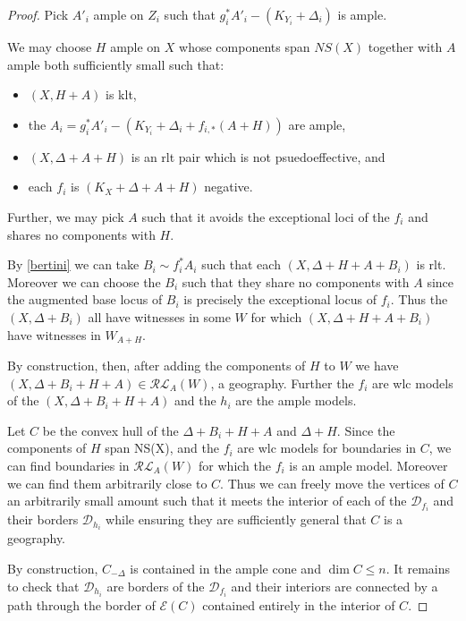 \begin{proof}

	Pick $A'_{i}$ ample on $Z_{i}$ such that $g_{i}^{*}A'_{i}-(K_{Y_{i}}+\Delta_{i})$ is ample. 
	
	We may choose $H$ ample on $X$ whose components span $NS(X)$ together with $A$ ample both sufficiently small such that:
	\begin{itemize}
		\item $(X,H+A)$ is klt,
		\item the $A_{i} = g_{i}^{*}A'_{i}-(K_{Y_{i}}+\Delta_{i}+f_{i,*}(A+H))$ are ample,
		\item $(X,\Delta+A+H)$ is an rlt pair which is not psuedoeffective, and
		\item each $f_{i}$ is $(K_{X}+\Delta+A+H)$ negative.
	\end{itemize}

	Further, we may pick $A$ such that it avoids the exceptional loci of the $f_{i}$ and shares no components with $H$.
	
	By \autoref{bertini} we can take $B_{i} \sim f_{i}^{*}A_{i}$ such that each $(X,\Delta+H+A+B_{i})$ is rlt. Moreover we can choose the $B_{i}$ such that they share no components with $A$ since the augmented base locus of $B_{i}$ is precisely the exceptional locus of $f_{i}$. Thus the $(X,\Delta+B_{i})$ all have witnesses in some $W$ for which $(X,\Delta+H+A+B_{i})$ have witnesses in $W_{A+H}$.
	
	By construction, then, after adding the components of $H$ to $W$ we have $(X,\Delta+B_{i}+H+A) \in \mathcal{RL}_{A}(W)$, a geography. Further the $f_{i}$ are wlc models of the $(X,\Delta+B_{i}+H+A)$ and the $h_{i}$ are the ample models.
	
	Let $C$ be the convex hull of the $\Delta+B_{i}+H+A$ and $\Delta+H$. Since the components of $H$ span NS(X), and the $f_{i}$ are wlc models for boundaries in $C$, we can find boundaries in $\mathcal{RL}_{A}(W)$ for which the $f_{i}$ is an ample model. Moreover we can find them arbitrarily close to $C$. Thus we can freely move the vertices of $C$ an arbitrarily small amount such that it meets the interior of each of the $\mathcal{D}_{f_{i}}$ and their borders $\mathcal{D}_{h_{i}}$ while ensuring they are sufficiently general that $C$ is a geography. 
	
	By construction, $C_{-\Delta}$ is contained in the ample cone and $\dim C \leq n$. It remains to check that $\mathcal{D}_{h_{i}}$ are borders of the $\mathcal{D}_{f_{i}}$ and their interiors are connected by a path through the border of $\mathcal{E}(C)$ contained entirely in the interior of $C$.
	

\end{proof}
